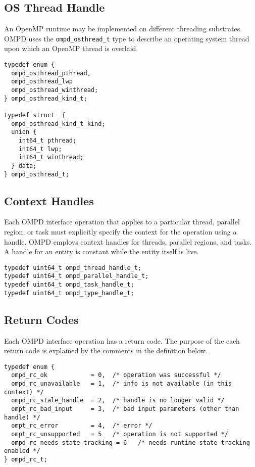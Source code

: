 \documentclass{article}
\begin{document}
\subsection{OS Thread Handle}

An OpenMP runtime may be implemented on different threading substrates. OMPD uses the \verb|ompd_osthread_t| type to describe an operating system thread upon which an OpenMP thread is overlaid.

\begin{verbatim}
typedef enum {
  ompd_osthread_pthread,
  ompd_osthread_lwp
  ompd_osthread_winthread;
} ompd_osthread_kind_t;

typedef struct  {
  ompd_osthread_kind_t kind;
  union {
    int64_t pthread;
    int64_t lwp;
    int64_t winthread;
  } data;
} ompd_osthread_t;
\end{verbatim}


\subsection{Context Handles}

Each OMPD interface operation that applies to a particular  thread, parallel
region, or task must  explicitly specify the context for the operation using a handle.
OMPD employs context handles for threads, parallel regions, and tasks.
A handle for an entity is constant while the entity itself is live.

\begin{verbatim}
typedef uint64_t ompd_thread_handle_t;
typedef uint64_t ompd_parallel_handle_t;
typedef uint64_t ompd_task_handle_t;
typedef uint64_t ompd_type_handle_t;
\end{verbatim}


\subsection{Return Codes}
Each OMPD interface operation has a return code. The purpose of the each return code is explained by the comments in the definition below.
\begin{verbatim}
typedef enum {
  ompd_rc_ok            = 0,  /* operation was successful */
  ompd_rc_unavailable   = 1,  /* info is not available (in this context) */
  ompd_rc_stale_handle  = 2,  /* handle is no longer valid */
  ompt_rc_bad_input     = 3,  /* bad input parameters (other than handle) */
  ompt_rc_error         = 4,  /* error */
  ompt_rc_unsupported   = 5   /* operation is not supported */
  ompd_rc_needs_state_tracking = 6   /* needs runtime state tracking enabled */
} ompd_rc_t;
\end{verbatim}
\end{document}
